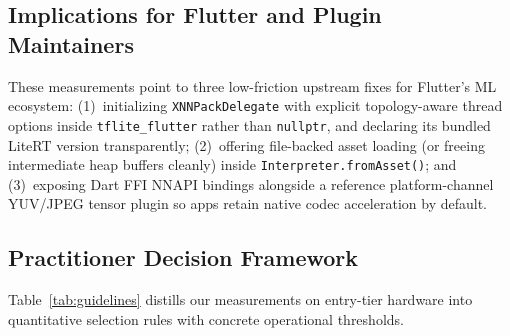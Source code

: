 \subsection{Implications for Flutter and Plugin Maintainers}
These measurements point to three low-friction upstream fixes for Flutter's ML ecosystem: (1)~initializing \texttt{XNNPackDelegate} with explicit topology-aware thread options inside \texttt{tflite\_flutter} rather than \texttt{nullptr}, and declaring its bundled LiteRT version transparently; (2)~offering file-backed asset loading (or freeing intermediate heap buffers cleanly) inside \texttt{Interpreter.fromAsset()}; and (3)~exposing Dart FFI NNAPI bindings alongside a reference platform-channel YUV/JPEG tensor plugin so apps retain native codec acceleration by default.

\subsection{Practitioner Decision Framework}
Table~\ref{tab:guidelines} distills our measurements on entry-tier hardware into quantitative selection rules with concrete operational thresholds.

